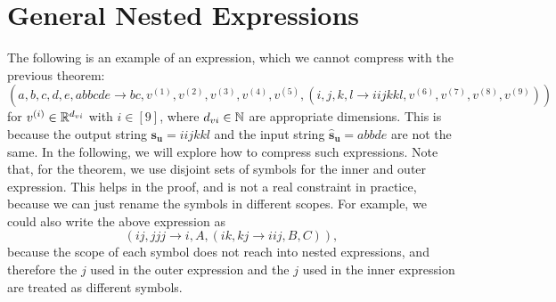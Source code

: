 \section{General Nested Expressions}

The following is an example of an expression, which we cannot compress with the previous theorem:
$$(a,b,c,d,e,abbcde \rightarrow bc, v^{(1)}, v^{(2)}, v^{(3)}, v^{(4)}, v^{(5)}, (
    i,j,k,l \rightarrow iijkkl, v^{(6)}, v^{(7)}, v^{(8)}, v^{(9)}
    ))$$
for $v^{(i)} \in \mathbb{R}^{d_{vi}}$ with $i \in [9]$, where $d_{vi} \in \mathbb{N}$ are appropriate dimensions.
This is because the output string $\bm{s_u} = iijkkl$ and the input string $\bm{\hat{s}_u} = abbde$ are not the same.
In the following, we will explore how to compress such expressions.
Note that, for the theorem, we use disjoint sets of symbols for the inner and outer expression.
This helps in the proof, and is not a real constraint in practice,
because we can just rename the symbols in different scopes.
For example, we could also write the above expression as
$$(ij, jjj \rightarrow i, A, (ik, kj \rightarrow iij, B, C)),$$
because the scope of each symbol does not reach into nested expressions,
and therefore the $j$ used in the outer expression and the $j$ used in the inner expression are treated as different symbols.

